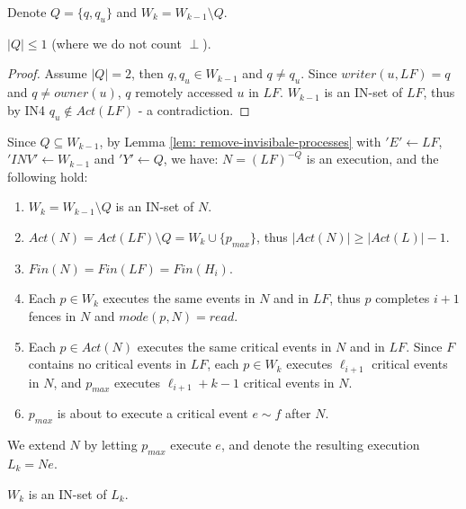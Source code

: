 Denote $Q = \{q,q_u\}$ and $W_k = W_{k-1} \setminus Q$.
\begin{claim-subsection}
\label{claim:subsection}
	$|Q| \leq 1$ (where we do not count $\perp$).
\end{claim-subsection}
\begin{proof}
	Assume $|Q| = 2$, then $q,q_u \in W_{k-1}$ and $q \neq q_u$. Since $writer(u, L F) = q$ and $q \neq owner(u)$, $q$ remotely accessed $u$ in $L F$. $W_{k-1}$ is an IN-set of $L F$, thus by IN4 $q_u \notin Act(L F)$ - a contradiction.
\end{proof}

Since $Q \subseteq W_{k-1}$, by Lemma \ref{lem: remove-invisibale-processes} with $'E' \leftarrow L F$, $'INV' \leftarrow W_{k-1}$ and $'Y' \leftarrow Q$, we have: $N = (L F)^{-Q}$ is an execution, and the following hold:
\begin{enumerate}
	\item $W_k = W_{k-1} \setminus Q$ is an IN-set of $N$.
	\item $Act(N) = Act(L F) \setminus Q = W_k \cup \{p_{max}\}$, thus $|Act(N)| \geq |Act(L)| - 1$.
	\item $Fin(N) = Fin(L F) = Fin(H_i)$.
	\item Each $p \in W_k$ executes the same events in $N$ and in $L F$, thus $p$ completes $i+1$ fences in $N$ and $mode(p,N) = read$.
	\item Each $p \in Act(N)$ executes the same critical events in $N$ and in $L F$. Since $F$ contains no critical events in $L F$, each $p \in W_k$ executes $\ell_{i+1}$ critical events in $N$, and $p_{max}$ executes $\ell_{i+1}+k-1$ critical events in $N$.
	\item $p_{max}$ is about to execute a critical event $e \sim f$ after $N$.
\end{enumerate}

We extend $N$ by letting $p_{max}$ execute $e$, and denote the resulting execution $L_k = N e$.

\begin{claim-subsection} \label{claim: W_k-is-an-IN-set}
	$W_k$ is an IN-set of $L_k$.
\end{claim-subsection}

